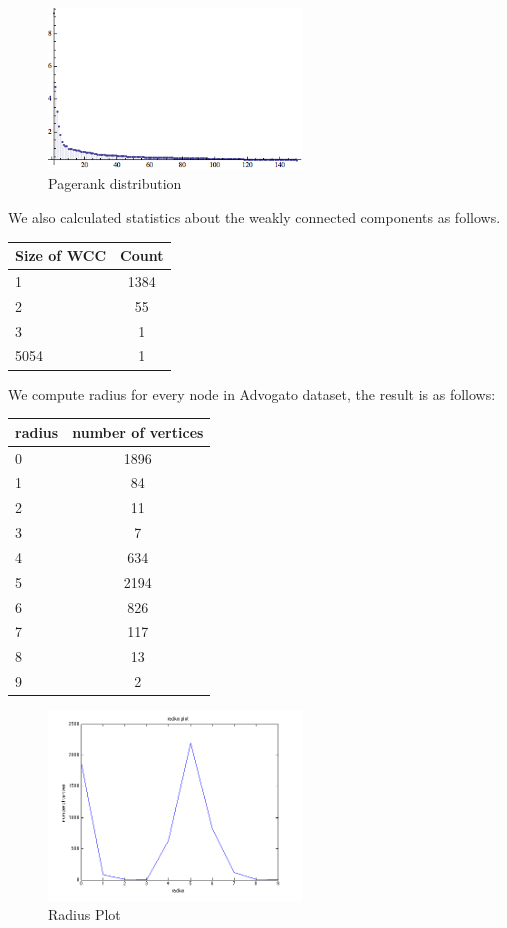 \begin{figure}[htbf]
\begin{center}
     \includegraphics[width=0.6\textwidth]{FIG/pagerank.png}
\caption{Pagerank distribution}
\label{fig:pagerank}
\end{center}
\end{figure}

We also calculated statistics about the weakly connected components as follows.

\begin{center}
\begin{tabular}{| l | c |}
  \hline                        
  Size of WCC & Count  \\ \hline
  1 & 1384  \\ \hline
  2 & 55  \\ \hline
  3 & 1 \\ \hline
  5054 & 1 \\ \hline  
\end{tabular}
\end{center}

We compute radius for every node in Advogato dataset, the result is as follows:
\begin{center}
\begin{tabular}{| l | c |}
  \hline                        
  radius & number of vertices  \\ \hline
  0 & 1896  \\ \hline
  1 & 84  \\ \hline
  2 & 11 \\ \hline
  3 & 7 \\ \hline  
  4 & 634 \\ \hline  
  5 & 2194 \\ \hline  
  6 & 826 \\ \hline  
  7 & 117 \\ \hline  
  8 & 13 \\ \hline
  9 & 2 \\ \hline   
\end{tabular}
\end{center} 

\begin{figure}[htbf]
\begin{center}
     \includegraphics[width=0.6\textwidth]{FIG/radius.png}
\caption{Radius Plot}
\label{fig:radius}
\end{center}
\end{figure}
